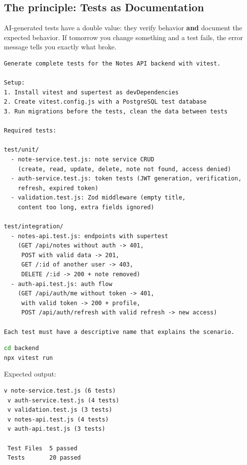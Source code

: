 \subsection{The principle: Tests as Documentation}

AI-generated tests have a double value: they verify behavior \textbf{and} document the expected behavior. If tomorrow you change something and a test fails, the error message tells you exactly what broke.

\begin{praticabox}[title={Practice --- Generate backend tests}]
\begin{lstlisting}[language={}]
Generate complete tests for the Notes API backend with vitest.

Setup:
1. Install vitest and supertest as devDependencies
2. Create vitest.config.js with a PostgreSQL test database
3. Run migrations before the tests, clean the data between tests

Required tests:

test/unit/
  - note-service.test.js: note service CRUD
    (create, read, update, delete, note not found, access denied)
  - auth-service.test.js: token tests (JWT generation, verification,
    refresh, expired token)
  - validation.test.js: Zod middleware (empty title,
    content too long, extra fields ignored)

test/integration/
  - notes-api.test.js: endpoints with supertest
    (GET /api/notes without auth -> 401,
     POST with valid data -> 201,
     GET /:id of another user -> 403,
     DELETE /:id -> 200 + note removed)
  - auth-api.test.js: auth flow
    (GET /api/auth/me without token -> 401,
     with valid token -> 200 + profile,
     POST /api/auth/refresh with valid refresh -> new access)

Each test must have a descriptive name that explains the scenario.
\end{lstlisting}
\end{praticabox}

\begin{lstlisting}[language=bash,title={Run the tests}]
cd backend
npx vitest run
\end{lstlisting}

Expected output:
\begin{lstlisting}[language={}]
 v note-service.test.js (6 tests)
 v auth-service.test.js (4 tests)
 v validation.test.js (3 tests)
 v notes-api.test.js (4 tests)
 v auth-api.test.js (3 tests)

 Test Files  5 passed
 Tests       20 passed
\end{lstlisting}

